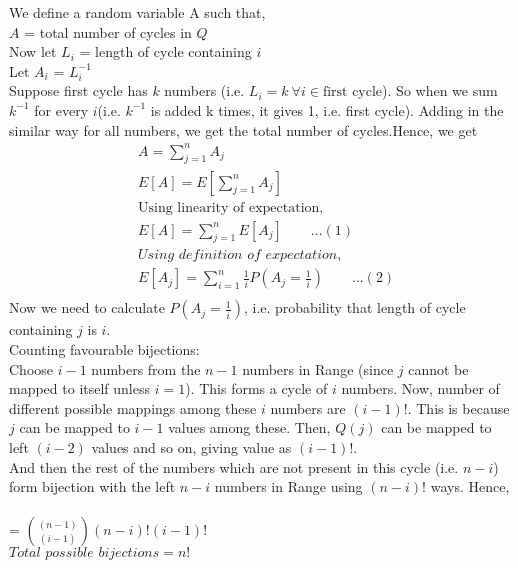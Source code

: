 \documentclass[12pt]{article}
\begin{document}
    \begin{solution}
        We define a random variable A such that,\\
        $A$ = total number of cycles in $Q$\\
        Now let $L_i$ = length of cycle containing $i$ \\
        Let $A_i$ = $L_i^{-1}$\\
        Suppose first cycle has $k$ numbers (i.e. $L_i=k \:\forall i\in \text{first cycle}$). So when we sum $k^{-1}$ for every $i$(i.e. $k^{-1}$ is added k times, it gives 1, i.e. first cycle).
        Adding in the similar way for all numbers, we get the total number of cycles.Hence, we get\\
        \begin{align*}
            &A = \sum_{j=1}^{n}A_j\\
            &E[A] = E[\sum_{j=1}^{n}A_j]\\
            &\text{Using linearity of expectation,}\\
            &E[A] = \sum_{j=1}^{n}E[A_j]\quad\quad...(1)\\
            &\textit{Using definition of expectation,}\\
            &E[A_j]=\sum_{i=1}^{n}\frac{1}{i}P(A_j=\frac{1}{i})\quad\quad...(2)\\
        \end{align*}
        Now we need to calculate $P(A_j=\frac{1}{i})$, i.e. probability that length of cycle containing $j$ is $i$.\\
        Counting favourable bijections:\\Choose $i-1$ numbers from the $n-1$ numbers in Range (since $j$ cannot be mapped to itself unless $i=1$). This forms a cycle of $i$ numbers. Now, number of different possible mappings among these $i$ numbers are $(i-1)!$. This is because $j$ can be mapped to $i-1$ values among these. Then, $Q(j)$ can be mapped to left $(i-2)$ values and so on, giving value as $(i-1)!$.\\
        And then the rest of the numbers which are not present in this cycle (i.e. $n-i$) form bijection with the left $n-i$ numbers in Range using $(n-i)!$ ways.
        Hence,\\ \\
         = ${{(n-1)}\choose{(i-1)}} (n-i)!(i-1)!$\\
        $\textit{Total possible bijections}=n!$\\

\end{solution}
\end{document}
